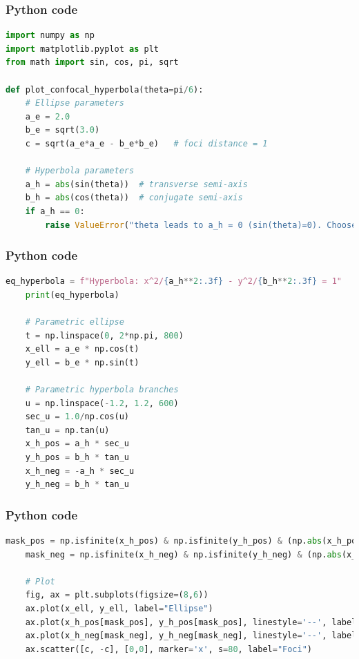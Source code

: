 \documentclass{beamer}
\begin{document}
\begin{frame}[fragile]
    \frametitle{Python code}
    \begin{lstlisting}[language=Python]
import numpy as np
import matplotlib.pyplot as plt
from math import sin, cos, pi, sqrt

def plot_confocal_hyperbola(theta=pi/6):
    # Ellipse parameters
    a_e = 2.0
    b_e = sqrt(3.0)
    c = sqrt(a_e*a_e - b_e*b_e)   # foci distance = 1
    
    # Hyperbola parameters
    a_h = abs(sin(theta))  # transverse semi-axis
    b_h = abs(cos(theta))  # conjugate semi-axis
    if a_h == 0:
        raise ValueError("theta leads to a_h = 0 (sin(theta)=0). Choose a different theta.")
    \end{lstlisting}   
\end{frame}

\begin{frame}[fragile]
    \frametitle{Python code}
    \begin{lstlisting}[language=Python]
 eq_hyperbola = f"Hyperbola: x^2/{a_h**2:.3f} - y^2/{b_h**2:.3f} = 1"
    print(eq_hyperbola)

    # Parametric ellipse
    t = np.linspace(0, 2*np.pi, 800)
    x_ell = a_e * np.cos(t)
    y_ell = b_e * np.sin(t)

    # Parametric hyperbola branches
    u = np.linspace(-1.2, 1.2, 600)
    sec_u = 1.0/np.cos(u)
    tan_u = np.tan(u)
    x_h_pos = a_h * sec_u
    y_h_pos = b_h * tan_u
    x_h_neg = -a_h * sec_u
    y_h_neg = b_h * tan_u

    \end{lstlisting}   
\end{frame}

\begin{frame}[fragile]
    \frametitle{Python code}
    \begin{lstlisting}[language=Python]
mask_pos = np.isfinite(x_h_pos) & np.isfinite(y_h_pos) & (np.abs(x_h_pos)<50) & (np.abs(y_h_pos)<50)
    mask_neg = np.isfinite(x_h_neg) & np.isfinite(y_h_neg) & (np.abs(x_h_neg)<50) & (np.abs(y_h_neg)<50)

    # Plot
    fig, ax = plt.subplots(figsize=(8,6))
    ax.plot(x_ell, y_ell, label="Ellipse")
    ax.plot(x_h_pos[mask_pos], y_h_pos[mask_pos], linestyle='--', label="Hyperbola (right branch)")
    ax.plot(x_h_neg[mask_neg], y_h_neg[mask_neg], linestyle='--', label="Hyperbola (left branch)")
    ax.scatter([c, -c], [0,0], marker='x', s=80, label="Foci")
    \end{lstlisting}   
\end{frame}
\end{document}
